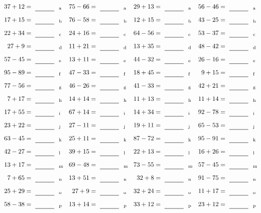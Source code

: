 \documentclass
[
  draft    = true,
  fontsize = 11pt,
  parskip  = half-
]
{scrartcl}
\begin{document}
\clearpage
\begin{align*}
    \pline{37+12}&=\rline{a}
  & \pline{75-66}&=\rline{a}
  & \pline{29+13}&=\rline{a}
  & \pline{56-46}&=\rline{a} \\[1ex]
    \pline{17+15}&=\rline{b}
  & \pline{76-58}&=\rline{b}
  & \pline{12+15}&=\rline{b}
  & \pline{43-25}&=\rline{b} \\[1ex]
    \pline{22+34}&=\rline{c}
  & \pline{24+16}&=\rline{c}
  & \pline{64-56}&=\rline{c}
  & \pline{53-37}&=\rline{c} \\[1ex]
    \pline{27+9}&=\rline{d}
  & \pline{11+21}&=\rline{d}
  & \pline{13+35}&=\rline{d}
  & \pline{48-42}&=\rline{d} \\[1ex]
    \pline{57-45}&=\rline{e}
  & \pline{13+11}&=\rline{e}
  & \pline{44-32}&=\rline{e}
  & \pline{26-16}&=\rline{e} \\[1ex]
    \pline{95-89}&=\rline{f}
  & \pline{47-33}&=\rline{f}
  & \pline{18+45}&=\rline{f}
  & \pline{9+15}&=\rline{f} \\[1ex]
    \pline{77-56}&=\rline{g}
  & \pline{46-26}&=\rline{g}
  & \pline{41-33}&=\rline{g}
  & \pline{42+21}&=\rline{g} \\[1ex]
    \pline{7+17}&=\rline{h}
  & \pline{14+14}&=\rline{h}
  & \pline{11+13}&=\rline{h}
  & \pline{11+14}&=\rline{h} \\[1ex]
    \pline{17+55}&=\rline{i}
  & \pline{67+14}&=\rline{i}
  & \pline{14+34}&=\rline{i}
  & \pline{92-78}&=\rline{i} \\[1ex]
    \pline{23+22}&=\rline{j}
  & \pline{27-11}&=\rline{j}
  & \pline{19+11}&=\rline{j}
  & \pline{65-53}&=\rline{j} \\[1ex]
    \pline{63-45}&=\rline{k}
  & \pline{25+11}&=\rline{k}
  & \pline{87-72}&=\rline{k}
  & \pline{95-91}&=\rline{k} \\[1ex]
    \pline{42-27}&=\rline{l}
  & \pline{39+15}&=\rline{l}
  & \pline{22+13}&=\rline{l}
  & \pline{16+26}&=\rline{l} \\[1ex]
    \pline{13+17}&=\rline{m}
  & \pline{69-48}&=\rline{m}
  & \pline{73-55}&=\rline{m}
  & \pline{57-45}&=\rline{m} \\[1ex]
    \pline{7+65}&=\rline{n}
  & \pline{13+51}&=\rline{n}
  & \pline{32+8}&=\rline{n}
  & \pline{91-75}&=\rline{n} \\[1ex]
    \pline{25+29}&=\rline{o}
  & \pline{27+9}&=\rline{o}
  & \pline{32+24}&=\rline{o}
  & \pline{11+17}&=\rline{o} \\[1ex]
    \pline{58-38}&=\rline{p}
  & \pline{13+14}&=\rline{p}
  & \pline{33+12}&=\rline{p}
  & \pline{23+12}&=\rline{p}
\end{align*}
\end{document}

